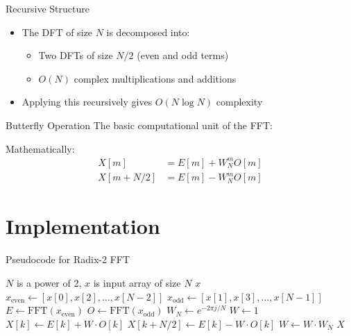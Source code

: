 \documentclass{beamer}
\begin{document}
\begin{frame}{Recursive Structure}
  \begin{itemize}
  \item The DFT of size $N$ is decomposed into:
    \begin{itemize}
    \item Two DFTs of size $N/2$ (even and odd terms)
    \item $O(N)$ complex multiplications and additions
    \end{itemize}
  \item Applying this recursively gives $O(N \log N)$ complexity
  \end{itemize}
  \begin{center}
  \end{center}
\end{frame}

\begin{frame}{Butterfly Operation}
  The basic computational unit of the FFT:
  \begin{center}
  \end{center}
  Mathematically:
  \begin{align*}
    X[m] &= E[m] + W_N^m O[m] \\
    X[m+N/2] &= E[m] - W_N^m O[m]
  \end{align*}
\end{frame}

\section{Implementation}

\begin{frame}{Pseudocode for Radix-2 FFT}
  \begin{algorithm}[H]
    \begin{algorithmic}[1]
      \REQUIRE $N$ is a power of 2, $x$ is input array of size $N$
      \RETURN $x$
      \ENDIF
      \STATE $x_{\text{even}} \gets [x[0], x[2], \ldots, x[N-2]]$
      \STATE $x_{\text{odd}} \gets [x[1], x[3], \ldots, x[N-1]]$
      \STATE $E \gets \text{FFT}(x_{\text{even}})$
      \STATE $O \gets \text{FFT}(x_{\text{odd}})$
      \STATE $W_N \gets e^{-2\pi j / N}$
      \STATE $W \gets 1$
      \STATE $X[k] \gets E[k] + W \cdot O[k]$
      \STATE $X[k + N/2] \gets E[k] - W \cdot O[k]$
      \STATE $W \gets W \cdot W_N$
      \ENDFOR
      \RETURN $X$
    \end{algorithmic}
    \caption{Recursive Radix-2 FFT}
  \end{algorithm}
\end{frame}
\end{document}
